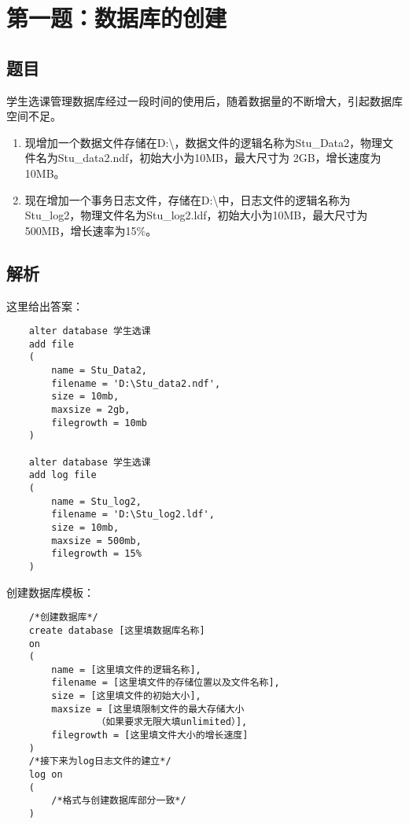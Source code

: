 \section{第一题：数据库的创建}

\subsection{题目}

\qquad 学生选课管理数据库经过一段时间的使用后，随着数据量的不断增大，引起数据库空间不足。

\begin{enumerate}
  \item 现增加一个数据文件存储在D:\textbackslash，数据文件的逻辑名称为Stu\_Data2，物理文件名为Stu\_data2.ndf，初始大小为10MB，最大尺寸为 2GB，增长速度为10MB。
  \item 现在增加一个事务日志文件，存储在D:\textbackslash 中，日志文件的逻辑名称为Stu\_log2，物理文件名为Stu\_log2.ldf，初始大小为10MB，最大尺寸为500MB，增长速率为15\%。
\end{enumerate}

\subsection{解析}

\qquad 这里给出答案：

\begin{mdframed}[backgroundcolor=blue!5]

\begin{verbatim}
    alter database 学生选课
    add file
    (
        name = Stu_Data2,
        filename = 'D:\Stu_data2.ndf',
        size = 10mb,
        maxsize = 2gb,
        filegrowth = 10mb
    )

    alter database 学生选课
    add log file
    (
        name = Stu_log2,
        filename = 'D:\Stu_log2.ldf',
        size = 10mb,
        maxsize = 500mb,
        filegrowth = 15%
    )
\end{verbatim}

\end{mdframed}

\qquad 创建数据库模板：

\begin{mdframed}[backgroundcolor=gray!10]
\begin{verbatim}
    /*创建数据库*/
    create database [这里填数据库名称]
    on
    (
        name = [这里填文件的逻辑名称],
        filename = [这里填文件的存储位置以及文件名称],
        size = [这里填文件的初始大小],
        maxsize = [这里填限制文件的最大存储大小
                （如果要求无限大填unlimited）],
        filegrowth = [这里填文件大小的增长速度]
    )
    /*接下来为log日志文件的建立*/
    log on
    (
        /*格式与创建数据库部分一致*/
    )
\end{verbatim}
\end{mdframed}

